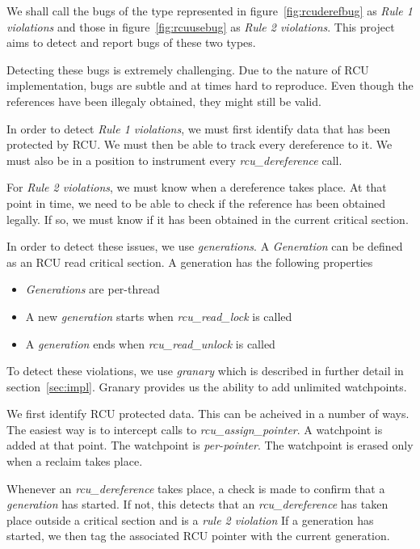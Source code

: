 We shall call the bugs of the type represented in figure~\ref{fig:rcuderefbug} as \emph{Rule 1 violations}
and those in figure~\ref{fig:rcuusebug} as \emph{Rule 2 violations}.
This project aims to detect and report bugs of these two types.

Detecting these bugs is extremely challenging. Due to the nature of RCU implementation,
bugs are subtle and at times hard to reproduce. Even though the references have been
illegaly obtained, they might still be valid.

In order to detect \emph{Rule 1 violations}, we must first identify data
that has been protected by RCU. We must then be able to track every
dereference to it. We must also be in a position to instrument
every \emph{rcu\_dereference} call.

For \emph{Rule 2 violations}, we must know when a dereference takes place.
At that point in time, we need to be able to check if the reference has
been obtained legally. If so, we must know if it has been obtained in
the current critical section.

In order to detect these issues, we use \emph{generations}. A \emph{Generation}
can be defined as an RCU read critical section. A generation has the following
properties

\begin{itemize}

\item \emph{Generations} are per-thread
\item A new \emph{generation} starts when \emph{rcu\_read\_lock} is called
\item A \emph{generation} ends when \emph{rcu\_read\_unlock} is called

\end{itemize}

To detect these violations, we use \emph{granary} which is described in
further detail in section~\ref{sec:impl}. Granary provides us the ability
to add unlimited watchpoints.

We first identify RCU protected data.
This can be acheived in a number of ways. The easiest way is to intercept calls
to \emph{rcu\_assign\_pointer}. A watchpoint is added at that point. The watchpoint
is \emph{per-pointer}. The watchpoint is erased only when a reclaim takes place.

Whenever an \emph{rcu\_dereference} takes place, a check is made to confirm that
a \emph{generation} has started. If not, this detects that an \emph{rcu\_dereference}
has taken place outside a critical section and is a \emph{rule 2 violation} If a
generation has started, we then tag the associated RCU pointer with the current
generation.

